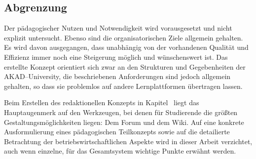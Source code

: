 \subsection{Abgrenzung} %
\label{sub:abgrenzung}
Der pädagogischer Nutzen und Notwendigkeit wird vorausgesetzt und nicht explizit untersucht. Ebenso sind die organisatorischen Ziele allgemein gehalten. Es wird davon ausgegangen, dass unabhängig von der vorhandenen Qualität und Effizienz immer noch eine Steigerung möglich und wünschenswert ist. Das erstellte Konzept orientiert sich zwar an den Strukturen und Gegebenheiten der AKAD–University, die beschriebenen Anforderungen sind jedoch allgemein gehalten, so dass sie problemlos auf andere Lernplattformen übertragen lassen. 

Beim Erstellen des redaktionellen Konzepts in Kapitel~ liegt das Hauptaugenmerk auf den Werkzeugen, bei denen für Studierende die größten Gestaltungsmöglichkeiten liegen: Dem Forum und dem Wiki. Auf eine konkrete Ausformulierung eines pädagogischen Teilkonzepts sowie auf die detailierte Betrachtung der betriebswirtschaftlichen Aspekte wird in dieser Arbeit verzichtet, auch wenn einzelne, für das Gesamtsystem wichtige Punkte erwähnt werden.

